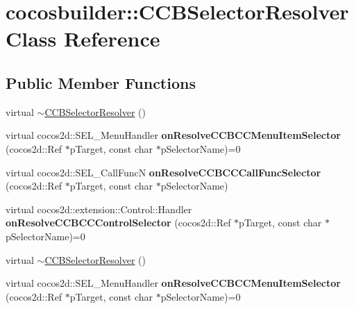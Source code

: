 \hypertarget{classcocosbuilder_1_1CCBSelectorResolver}{}\section{cocosbuilder\+:\+:C\+C\+B\+Selector\+Resolver Class Reference}
\label{classcocosbuilder_1_1CCBSelectorResolver}
\subsection*{Public Member Functions}
\begin{DoxyCompactItemize}
\item 
virtual \hyperlink{classcocosbuilder_1_1CCBSelectorResolver_a4a6c8b67d0adbbf894d0e8662de74674}{$\sim$\+C\+C\+B\+Selector\+Resolver} ()
\item 
\mbox{\label{classcocosbuilder_1_1CCBSelectorResolver_af251ce596af728f5d89214d1413b90aa}} 
virtual cocos2d\+::\+S\+E\+L\+\_\+\+Menu\+Handler {\bfseries on\+Resolve\+C\+C\+B\+C\+C\+Menu\+Item\+Selector} (cocos2d\+::\+Ref $\ast$p\+Target, const char $\ast$p\+Selector\+Name)=0
\item 
\mbox{\label{classcocosbuilder_1_1CCBSelectorResolver_a13c8a6aedc8295fb5edd072fa0a9ba26}} 
virtual cocos2d\+::\+S\+E\+L\+\_\+\+Call\+FuncN {\bfseries on\+Resolve\+C\+C\+B\+C\+C\+Call\+Func\+Selector} (cocos2d\+::\+Ref $\ast$p\+Target, const char $\ast$p\+Selector\+Name)
\item 
\mbox{\label{classcocosbuilder_1_1CCBSelectorResolver_a5f9d6eba7ae0361a55f56cae00208a46}} 
virtual cocos2d\+::extension\+::\+Control\+::\+Handler {\bfseries on\+Resolve\+C\+C\+B\+C\+C\+Control\+Selector} (cocos2d\+::\+Ref $\ast$p\+Target, const char $\ast$p\+Selector\+Name)=0
\item 
virtual \hyperlink{classcocosbuilder_1_1CCBSelectorResolver_a4a6c8b67d0adbbf894d0e8662de74674}{$\sim$\+C\+C\+B\+Selector\+Resolver} ()
\item 
\mbox{\label{classcocosbuilder_1_1CCBSelectorResolver_af251ce596af728f5d89214d1413b90aa}} 
virtual cocos2d\+::\+S\+E\+L\+\_\+\+Menu\+Handler {\bfseries on\+Resolve\+C\+C\+B\+C\+C\+Menu\+Item\+Selector} (cocos2d\+::\+Ref $\ast$p\+Target, const char $\ast$p\+Selector\+Name)=0

\end{DoxyCompactItemize}
